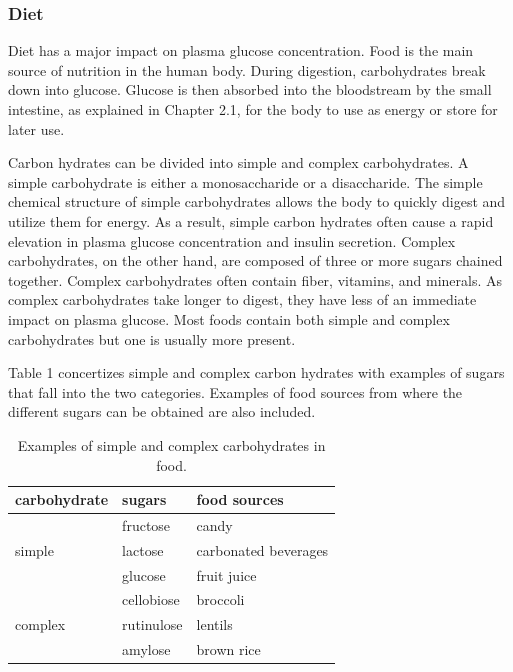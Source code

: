 \documentclass[english, 12pt, a4paper, elec, utf8, a-1b, online]{aaltothesis}
\begin{document}
\subsubsection{Diet}
Diet has a major impact on plasma glucose concentration\cite{russell_impact_2016}. Food is the main 
source of nutrition in the human body. During digestion, carbohydrates break down into glucose. 
Glucose is then absorbed into the bloodstream by the small intestine, as explained in Chapter 2.1, 
for the body to use as energy or store for later use. 

Carbon hydrates can be divided into simple and complex carbohydrates\cite{griel_changing_2006}. 
A simple carbohydrate is either a monosaccharide or a disaccharide.
The simple chemical structure of simple carbohydrates allows the body to quickly
digest and utilize them for energy. As a result, simple carbon hydrates often cause a rapid 
elevation in plasma glucose concentration and insulin secretion\cite{holesh_carbs}.
Complex carbohydrates, on the other hand, are composed of three or more sugars chained 
together. Complex carbohydrates often contain fiber, vitamins, and minerals. As complex 
carbohydrates take longer to digest, they have less of an immediate impact on plasma glucose\cite{holesh_carbs}.
Most foods contain both simple and complex carbohydrates but one is usually more present\cite{russell_impact_2016}.

Table 1 concertizes simple and complex carbon hydrates with examples of sugars that fall into the two categories. Examples of food sources from where the different sugars can be obtained are also included. 

\begin{table}[H]
\begin{center}
\begin{tabular}{ | m{3cm} | m{4cm}| m{4cm} | }
    \hline
    \textbf{carbohydrate} & \textbf{sugars} & \textbf{food sources} \\ 
    \hline
    & fructose & candy \\
    simple & lactose &  carbonated beverages \\
    & glucose & fruit juice \\
    \hline
    & cellobiose & broccoli \\
    complex & rutinulose & lentils \\ 
    & amylose & brown rice \\
    \hline
\end{tabular}
\caption{Examples of simple and complex carbohydrates in food\cite{physiology_carbohydrate}.}
\end{center}
\end{table}
\end{document}
